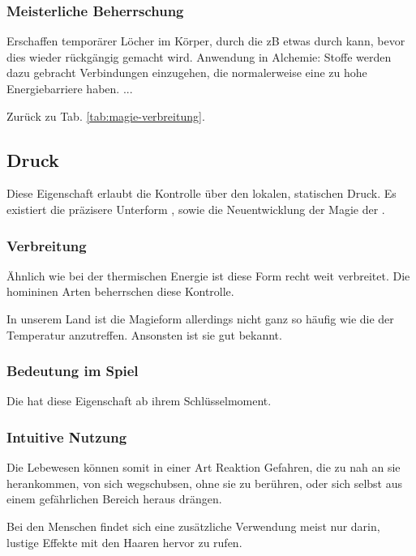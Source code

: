 \subsubsection{Meisterliche Beherrschung} 
\begin{outline}
	\1 Erschaffen temporärer Löcher im Körper, durch die zB etwas durch kann, bevor dies wieder rückgängig gemacht wird.
	\1 Anwendung in Alchemie: Stoffe werden dazu gebracht Verbindungen einzugehen, die normalerweise eine zu hohe Energiebarriere haben.
	\1 ...
\end{outline}
Zurück zu Tab. \ref{tab:magie-verbreitung}.



\subsection{Druck}\label{sec:druckmagie}
Diese Eigenschaft erlaubt die Kontrolle über den lokalen, statischen Druck. 
Es existiert die präzisere Unterform , sowie die Neuentwicklung der Magie der .

\subsubsection{Verbreitung}
Ähnlich wie bei der thermischen Energie ist diese Form recht weit verbreitet. 
Die homininen Arten beherrschen diese Kontrolle. 

In unserem Land ist die Magieform allerdings nicht ganz so häufig wie die der Temperatur anzutreffen. 
Ansonsten ist sie gut bekannt.

\subsubsection{Bedeutung im Spiel}
Die  hat diese Eigenschaft ab ihrem Schlüsselmoment. %

\subsubsection{Intuitive Nutzung}
Die Lebewesen können somit in einer Art Reaktion Gefahren, die zu nah an sie herankommen, von sich wegschubsen, ohne sie zu berühren, oder sich selbst aus einem gefährlichen Bereich heraus drängen. 

Bei den Menschen findet sich eine zusätzliche Verwendung meist nur darin, lustige Effekte mit den Haaren hervor zu rufen.

